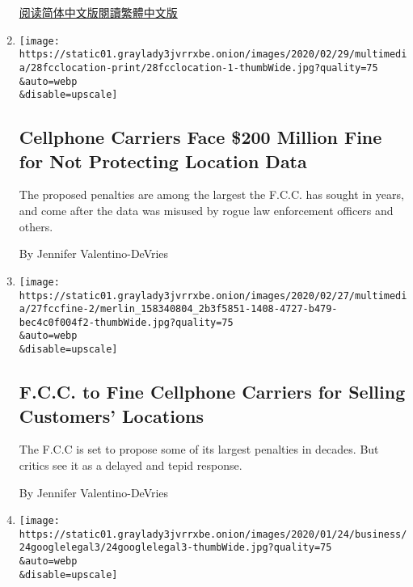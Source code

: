 \begin{enumerate}
  \href{https://cn.nytimes3xbfgragh.onion/world/20200320/coronavirus-location-tracking/}{阅读简体中文版}\href{https://cn.nytimes3xbfgragh.onion/world/20200320/coronavirus-location-tracking/zh-hanty}{閱讀繁體中文版}
\item
  \href{/2020/02/28/technology/fcc-cellphones-location-data-fines.html}{}

  \texttt{[image: https://static01.graylady3jvrrxbe.onion/images/2020/02/29/multimedia/28fcclocation-print/28fcclocation-1-thumbWide.jpg?quality=75\\\&auto=webp\\\&disable=upscale]}

  \hypertarget{cellphone-carriers-face-200-million-fine-for-not-protecting-location-data}{%
  \subsection{Cellphone Carriers Face \$200 Million Fine for Not
  Protecting Location
  Data}\label{cellphone-carriers-face-200-million-fine-for-not-protecting-location-data}}

  The proposed penalties are among the largest the F.C.C. has sought in
  years, and come after the data was misused by rogue law enforcement
  officers and others.

  By Jennifer Valentino-DeVries
\item
  \href{/2020/02/27/technology/fcc-location-data.html}{}

  \texttt{[image: https://static01.graylady3jvrrxbe.onion/images/2020/02/27/multimedia/27fccfine-2/merlin\_158340804\_2b3f5851-1408-4727-b479-bec4c0f004f2-thumbWide.jpg?quality=75\\\&auto=webp\\\&disable=upscale]}

  \hypertarget{fcc-to-fine-cellphone-carriers-for-selling-customers-locations}{%
  \subsection{F.C.C. to Fine Cellphone Carriers for Selling Customers'
  Locations}\label{fcc-to-fine-cellphone-carriers-for-selling-customers-locations}}

  The F.C.C is set to propose some of its largest penalties in decades.
  But critics see it as a delayed and tepid response.

  By Jennifer Valentino-DeVries
\item
  \href{/2020/01/24/technology/google-search-warrants-legal-fees.html}{}

  \texttt{[image: https://static01.graylady3jvrrxbe.onion/images/2020/01/24/business/24googlelegal3/24googlelegal3-thumbWide.jpg?quality=75\\\&auto=webp\\\&disable=upscale]}


\end{enumerate}
